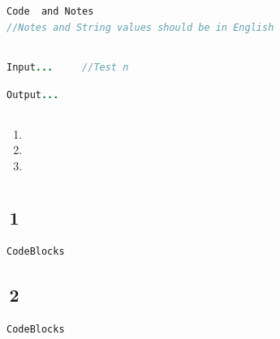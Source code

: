 \documentclass{article}
\begin{document}
\subsection{}
\begin{center}
	\begin{lstlisting}[language = Java]
Code  and Notes        
//Notes and String values should be in English
	\end{lstlisting}
\end{center}


\subsection{}
\begin{center}
	\begin{lstlisting}[language = Java]
Input...     //Test n
	\end{lstlisting}
\end{center}

\begin{center}
\begin{lstlisting}[language = Java]
Output...
\end{lstlisting}
\end{center}
\subsection{}
\begin{enumerate}
	\item\kaishu
	\item\kaishu
	\item\kaishu
\end{enumerate}
\newpage

\section{}
\subsection{\,1}
\begin{center}
\begin{lstlisting}[language=Java]
CodeBlocks
\end{lstlisting}
\end{center}
\subsection{\,2}
\begin{center}
\begin{lstlisting}[language=Java]
CodeBlocks
\end{lstlisting}
\end{center}
\end{document}

